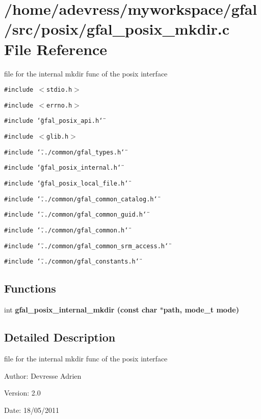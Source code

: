 \section{/home/adevress/myworkspace/gfal/src/posix/gfal\_\-posix\_\-mkdir.c File Reference}
\label{gfal__posix__mkdir_8c}
file for the internal mkdir func of the posix interface 

{\tt \#include $<$stdio.h$>$}\par
{\tt \#include $<$errno.h$>$}\par
{\tt \#include \char`\"{}gfal\_\-posix\_\-api.h\char`\"{}}\par
{\tt \#include $<$glib.h$>$}\par
{\tt \#include \char`\"{}../common/gfal\_\-types.h\char`\"{}}\par
{\tt \#include \char`\"{}gfal\_\-posix\_\-internal.h\char`\"{}}\par
{\tt \#include \char`\"{}gfal\_\-posix\_\-local\_\-file.h\char`\"{}}\par
{\tt \#include \char`\"{}../common/gfal\_\-common\_\-catalog.h\char`\"{}}\par
{\tt \#include \char`\"{}../common/gfal\_\-common\_\-guid.h\char`\"{}}\par
{\tt \#include \char`\"{}../common/gfal\_\-common.h\char`\"{}}\par
{\tt \#include \char`\"{}../common/gfal\_\-common\_\-srm\_\-access.h\char`\"{}}\par
{\tt \#include \char`\"{}../common/gfal\_\-constants.h\char`\"{}}\par
\subsection*{Functions}
\begin{CompactItemize}
\item 
int \bf{gfal\_\-posix\_\-internal\_\-mkdir} (const char $\ast$path, mode\_\-t mode)
\end{CompactItemize}


\subsection{Detailed Description}
file for the internal mkdir func of the posix interface 

\begin{Desc}
\item[Author:]Devresse Adrien \end{Desc}
\begin{Desc}
\item[Version:]2.0 \end{Desc}
\begin{Desc}
\item[Date:]18/05/2011 \end{Desc}


